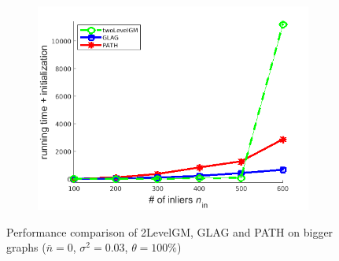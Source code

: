 \begin{figure}[h]
\begin{subfigure}[b]{0.32\textwidth}
			\includegraphics[scale=0.25]{"chapter3/fig/SyntheticTest_BigGraphs/descr/Results_v4.3.3/Test2/time_summary_avg1t"} 
		\end{subfigure} 	
	\caption[Performance comparison of 2LevelGM, GLAG and PATH on bigger graphs: test $2$]{Performance comparison of 2LevelGM, GLAG and PATH on bigger graphs ($\bar{n}=0$, $\sigma^2=0.03$, $\theta=100\%$)}
	\label{fig:synTest2_bigGraphs_ver433}
\end{figure}
